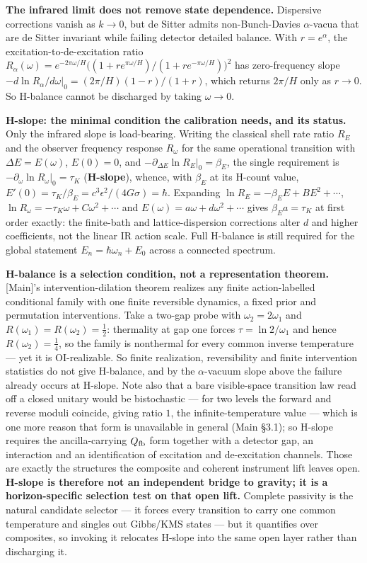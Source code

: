 \documentclass[
]{article}
\begin{document}
\textbf{The infrared limit does not remove state dependence.} Dispersive
corrections vanish as \(k\to0\), but de Sitter admits non-Bunch-Davies
\(\alpha\)-vacua that are de Sitter invariant while failing detector
detailed balance. With \(r=e^\alpha\), the excitation-to-de-excitation
ratio
\(R_\alpha(\omega)=e^{-2\pi\omega/H}\big((1+re^{\pi\omega/H})/(1+re^{-\pi\omega/H})\big)^2\)
has zero-frequency slope
\(-d\ln R_\alpha/d\omega|_0=(2\pi/H)(1-r)/(1+r)\), which returns
\(2\pi/H\) only as \(r\to0\). So H-balance cannot be discharged by
taking \(\omega\to0\).

\textbf{H-slope: the minimal condition the calibration needs, and its
status.} Only the infrared slope is load-bearing. Writing the classical
shell rate ratio \(R_E\) and the observer frequency response
\(R_\omega\) for the same operational transition with
\(\Delta E=E(\omega)\), \(E(0)=0\), and
\(-\partial_{\Delta E}\ln R_E|_0=\beta_E\), the single requirement is
\(-\partial_\omega\ln R_\omega|_0=\tau_K\) (\textbf{H-slope}), whence,
with \(\beta_E\) at its H-count value,
\(E'(0)=\tau_K/\beta_E=c^3\epsilon^2/(4G\sigma)=\hbar\). Expanding
\(\ln R_E=-\beta_EE+BE^2+\cdots\),
\(\ln R_\omega=-\tau_K\omega+C\omega^2+\cdots\) and
\(E(\omega)=a\omega+d\omega^2+\cdots\) gives \(\beta_Ea=\tau_K\) at
first order exactly: the finite-bath and lattice-dispersion corrections
alter \(d\) and higher coefficients, not the linear IR action scale.
Full H-balance is still required for the global statement
\(E_n=\hbar\omega_n+E_0\) across a connected spectrum.

\textbf{H-balance is a selection condition, not a representation
theorem.} {[}Main{]}'s intervention-dilation theorem realizes any finite
action-labelled conditional family with one finite reversible dynamics,
a fixed prior and permutation interventions. Take a two-gap probe with
\(\omega_2=2\omega_1\) and \(R(\omega_1)=R(\omega_2)=\tfrac12\):
thermality at gap one forces \(\tau=\ln2/\omega_1\) and hence
\(R(\omega_2)=\tfrac14\), so the family is nonthermal for every common
inverse temperature --- yet it is OI-realizable. So finite realization,
reversibility and finite intervention statistics do not give H-balance,
and by the \(\alpha\)-vacuum slope above the failure already occurs at
H-slope. Note also that a bare visible-space transition law read off a
closed unitary would be bistochastic --- for two levels the forward and
reverse moduli coincide, giving ratio \(1\), the infinite-temperature
value --- which is one more reason that form is unavailable in general
(Main §3.1); so H-slope requires the ancilla-carrying \(Q_{\rm fb}\)
form together with a detector gap, an interaction and an identification
of excitation and de-excitation channels. Those are exactly the
structures the composite and coherent instrument lift leaves open.
\textbf{H-slope is therefore not an independent bridge to gravity; it is
a horizon-specific selection test on that open lift.} Complete passivity
is the natural candidate selector --- it forces every transition to
carry one common temperature and singles out Gibbs/KMS states --- but it
quantifies over composites, so invoking it relocates H-slope into the
same open layer rather than discharging it.
\end{document}
